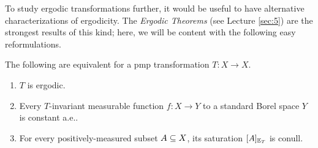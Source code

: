 \documentclass[reqno, twoside]{article}
\begin{document}
    To study ergodic transformations further, it would be useful to have alternative characterizations of ergodicity. The \textit{Ergodic Theorems} (see Lecture \ref{sec:5}) are the strongest results of this kind; here, we will be content with the following easy reformulations.

    \begin{theorem}\label{thm:easy_characterizations_ergodicitiy}
        The following are equivalent for a pmp transformation $T:X\to X$.
        \begin{enumerate}
            \item $T$ is ergodic.
                \vspace{-0.05in}
            \item Every $T$-invariant measurable function $f:X\to Y$ to a standard Borel space $Y$ is constant a.e..
                \vspace{-0.05in}
            \item For every positively-measured subset $A\subseteq X$, its saturation $[A]_{\mathbb{E}_T}$ is conull.
        \end{enumerate}
    \end{theorem}
\end{document}
